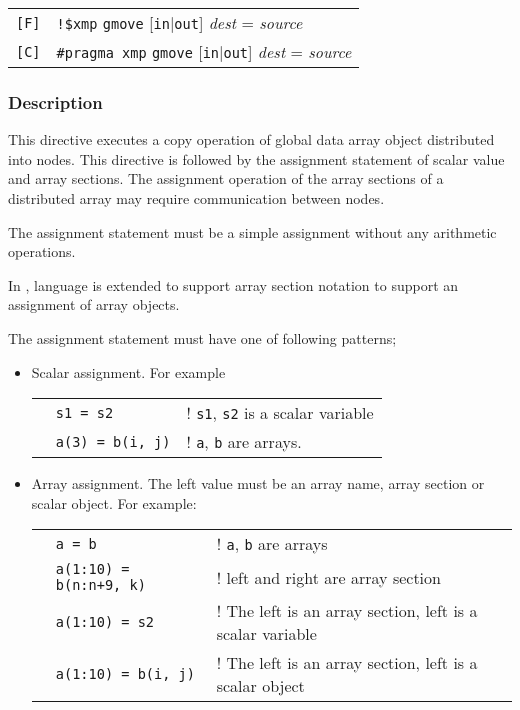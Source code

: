 \begin{tabular}{ll}
\verb![F]! & \verb|!$xmp| {\tt gmove} [{\tt in}$\vert${\tt out}] {\it dest}
= {\it source} \\
\verb![C]! & \verb|#pragma xmp| {\tt gmove} [{\tt in}$\vert${\tt out}] {\it
  dest} = {\it source} \\
\end{tabular}

\subsubsection*{Description}

This directive executes a copy operation of global data array object
distributed into nodes. This directive is followed by the assignment
statement of scalar value and array sections. The assignment operation
of the array sections of a distributed array may require communication
between nodes.

The assignment statement must be a simple assignment without
any arithmetic operations.   

In \XMP, \C language is extended to support array section notation to
support an assignment of array objects.

The assignment statement must have one of following patterns;

\begin{itemize}
\item  Scalar assignment. For example

\begin{tabular}{lll}
\hspace{0.5cm} & {\tt s1 = s2} & ! {\tt s1}, {\tt s2} is a scalar
variable \\ 
& {\tt a(3) = b(i, j)} & ! {\tt a}, {\tt b} are arrays. \\
\end{tabular}

\item Array assignment. The left value must be an array name,
array section or scalar object. For example:

\begin{tabular}{lll}
\hspace{0.5cm} & {\tt a = b} & ! {\tt a}, {\tt b} are arrays \\
 & {\tt a(1:10) = b(n:n+9, k)} & ! left and right are array section \\
 & {\tt a(1:10) = s2} & ! The left is an array section, left is a
 scalar variable \\
 & {\tt a(1:10) = b(i, j)} & ! The left is an array section, left is a
 scalar object \\
\end{tabular}
\end{itemize}

